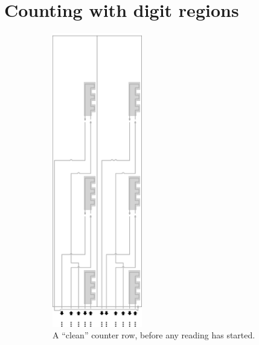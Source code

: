 
\section{Counting with digit regions}

\begin{figure}[H]
    \centering
    \begin{subfigure}[t]{0.43\textwidth}
        \centering
        \includegraphics[width=0.43\textwidth]{counter_read_start_general_case3_middle_level}
        \caption{\label{fig:counter_read_start_case3_middle_level} A ``clean'' counter row, before any reading has started.}
    \end{subfigure}%
    ~
    \begin{subfigure}[t]{0.43\textwidth}
        \centering

\end{subfigure}
\end{figure}
